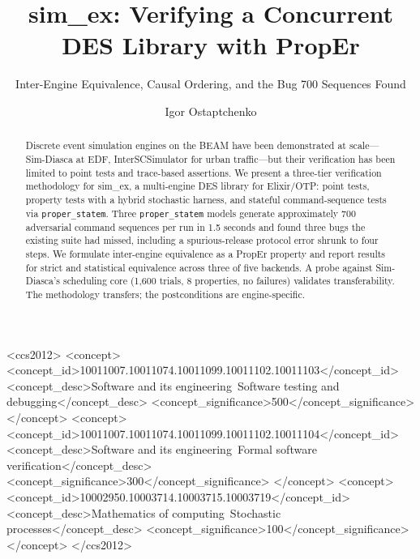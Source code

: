 \documentclass[sigplan,review,anonymous=false]{acmart}
\begin{document}
\title{sim\_ex: Verifying a Concurrent DES Library with PropEr}
\subtitle{Inter-Engine Equivalence, Causal Ordering, and the Bug 700 Sequences Found}

\author{Igor Ostaptchenko}

\begin{abstract}
Discrete event simulation engines on the BEAM have been demonstrated at
scale---Sim-Diasca at EDF, InterSCSimulator for urban traffic---but
their verification has been limited to point tests and trace-based
assertions. We present a three-tier verification methodology for
sim\_ex, a multi-engine DES library for Elixir/OTP: point tests, property
tests with a hybrid stochastic harness, and stateful command-sequence
tests via \texttt{proper\_statem}. Three \texttt{proper\_statem} models
generate approximately 700 adversarial command sequences per run in 1.5
seconds and found three bugs the existing suite had missed, including a
spurious-release protocol error shrunk to four steps. We formulate
inter-engine equivalence as a PropEr property and report results for
strict and statistical equivalence across three of five backends. A
probe against Sim-Diasca's scheduling core (1,600 trials, 8 properties,
no failures) validates transferability. The methodology transfers; the
postconditions are engine-specific.
\end{abstract}

\begin{CCSXML}
<ccs2012>
<concept>
<concept_id>10011007.10011074.10011099.10011102.10011103</concept_id>
<concept_desc>Software and its engineering~Software testing and debugging</concept_desc>
<concept_significance>500</concept_significance>
</concept>
<concept>
<concept_id>10011007.10011074.10011099.10011102.10011104</concept_id>
<concept_desc>Software and its engineering~Formal software verification</concept_desc>
<concept_significance>300</concept_significance>
</concept>
<concept>
<concept_id>10002950.10003714.10003715.10003719</concept_id>
<concept_desc>Mathematics of computing~Stochastic processes</concept_desc>
<concept_significance>100</concept_significance>
</concept>
</ccs2012>
\end{CCSXML}

\end{document}

